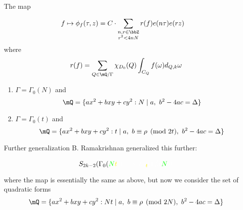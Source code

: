 \documentclass[mathserif,12pt]{beamer}
\begin{document}
\begin{frame}{The map}



\begin{align*}
f & \mapsto \phi_{f}(\tau, z) = C \cdot \sum_{\substack{n, r \in \bbZ \\ r^2 < 4nN}} r(f) e(n\tau) e(r z)
\end{align*}
where
\begin{equation*}
r(f) = \sum_{Q \in \mQ / \Gamma} \chi_{D_0}(Q) \int_{C_Q} f(\omega)d_{Q, k}\omega
\end{equation*}
\pause
\begin{enumerate}
\item $\Gamma = \Gamma_0(N)$ and
\begin{align*}
\mQ = \{ax^2 + bxy + cy^2: N \mid a, \text{    } b^2 - 4 a c = \Delta\}
\end{align*}
\pause
\item $\Gamma = \Gamma_0(t)$ and 
\begin{align*}
\mQ = \{ ax^2+bxy+cy^2: t \mid a, \text{    }b \equiv \rho \pmod{2t}, \text{    } b^2 - 4 a c = \Delta\}
\end{align*}
\end{enumerate}


\end{frame}


\begin{frame}{Further generalization}
B. Ramakrishnan generalized this further:\pause

\begin{equation*}
S_{2k - 2}(\Gamma_0(\color{green}N\color{yellow}t\color{white})) \longrightarrow J_{k, \color{yellow}t \color{white}}(\Gamma_0^{J}(\color{green}N\color{white}))
\end{equation*}

\pause

where the map is essentially the same as above, but now we consider the set of quadratic forms
\pause
\begin{align*}
\mQ = \{ ax^2+bxy+cy^2: Nt \mid a, \text{    }b \equiv \rho \pmod{2N}, \text{    } b^2 - 4 a c = \Delta\}
\end{align*}

\end{frame}
\end{document}
